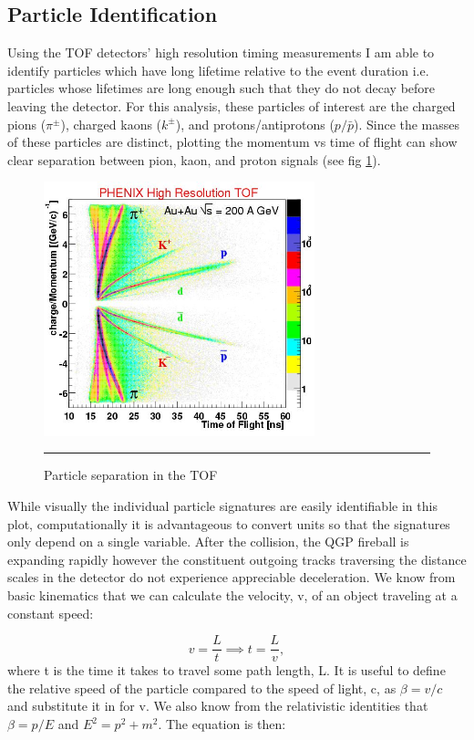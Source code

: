 \subsection{Particle Identification}
Using the TOF detectors' high resolution timing measurements I am able to identify particles which have long lifetime relative to the event duration i.e. particles whose lifetimes are long enough such that they do not decay before leaving the detector. For this analysis, these particles of interest are the charged pions ($\pi^{\pm}$), charged kaons ($k^{\pm}$), and protons/antiprotons ($p/\bar{p}$). Since the masses of these particles are distinct, plotting the momentum vs time of flight can show clear separation between pion, kaon, and proton signals (see fig \ref{fig:tofchargemom}). 

\begin{figure}[htbp!]
  \centering
    \includegraphics[width=0.7\textwidth]{Figures/tofchargemom.JPG}
    \rule{35em}{0.5pt}
  \caption[Particle separation in the TOF]{Particle separation in the TOF \citep{tofchargemom}}
  \label{fig:tofchargemom}
\end{figure}

While visually the individual particle signatures are easily identifiable in this plot, computationally it is advantageous to convert units so that the signatures only depend on a single variable. After the collision, the QGP fireball is expanding rapidly however the constituent outgoing tracks traversing the distance scales in the detector do not experience appreciable deceleration. We know from basic kinematics that we can calculate the velocity, v, of an object traveling at a constant speed:

\begin{equation}
v=\frac{L}{t} \implies t=\frac{L}{v},
\end{equation}
where t is the time it takes to travel some path length, L. It is useful to define the relative speed of the particle compared to the speed of light, c, as $\beta = v/c$ and substitute it in for v. We also know from the relativistic identities that $\beta = p/E$ and $E^{2} = p^{2} + m^{2}$. The equation is then: 

